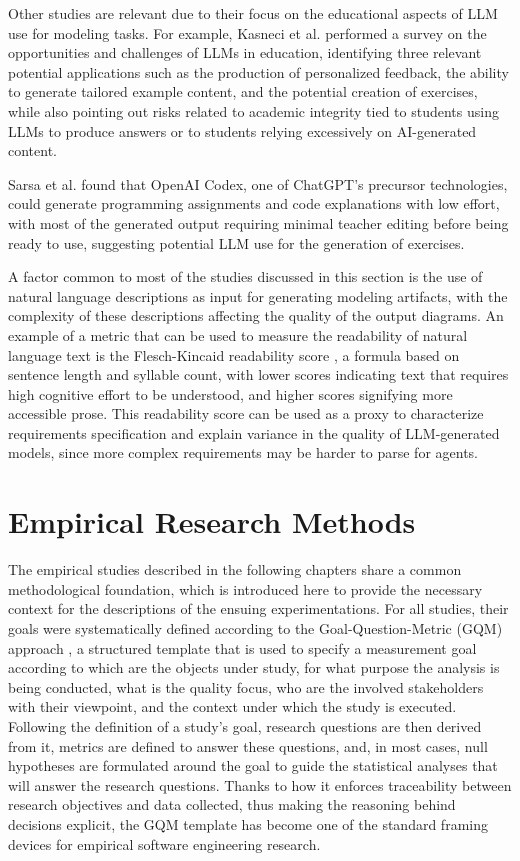 {{Other studies are relevant due to their focus on the educational aspects of LLM use for modeling tasks. For example, Kasneci et al. \cite{kasneci2023chatgpt} performed a survey on the opportunities and challenges of LLMs in education, identifying three relevant potential applications such as the production of personalized feedback, the ability to generate tailored example content, and the potential creation of exercises, while also pointing out risks related to academic integrity tied to students using LLMs to produce answers or to students relying excessively on AI-generated content.

Sarsa et al. \cite{sarsa2022automatic} found that OpenAI Codex, one of ChatGPT's precursor technologies, could generate programming assignments and code explanations with low effort, with most of the generated output requiring minimal teacher editing before being ready to use, suggesting potential LLM use for the generation of exercises. 

A factor common to most of the studies discussed in this section is the use of natural language descriptions as input for generating modeling artifacts, with the complexity of these descriptions affecting the quality of the output diagrams. An example of a metric that can be used to measure the readability of natural language text is the Flesch-Kincaid readability score \cite{solnyshkina2017flesch}, a formula based on sentence length and syllable count, with lower scores indicating text that requires high cognitive effort to be understood, and higher scores signifying more accessible prose. This readability score can be used as a proxy to characterize requirements specification and explain variance in the quality of LLM-generated models, since more complex requirements may be harder to parse for agents.

\section{Empirical Research Methods}
\label{sec:empirical_methods}

The empirical studies described in the following chapters share a common methodological foundation, which is introduced here to provide the necessary context for the descriptions of the ensuing experimentations. For all studies, their goals were systematically defined according to the Goal-Question-Metric (GQM) approach \cite{basili1994gqm}, a structured template that is used to specify a measurement goal according to which are the objects under study, for what purpose the analysis is being conducted, what is the quality focus, who are the involved stakeholders with their viewpoint, and the context under which the study is executed. Following the definition of a study's goal, research questions are then derived from it, metrics are defined to answer these questions, and, in most cases, null hypotheses are formulated around the goal to guide the statistical analyses that will answer the research questions.  Thanks to how it enforces traceability between research objectives and data collected, thus making the reasoning behind decisions explicit, the GQM template has become one of the standard framing devices for empirical software engineering research.

}}
